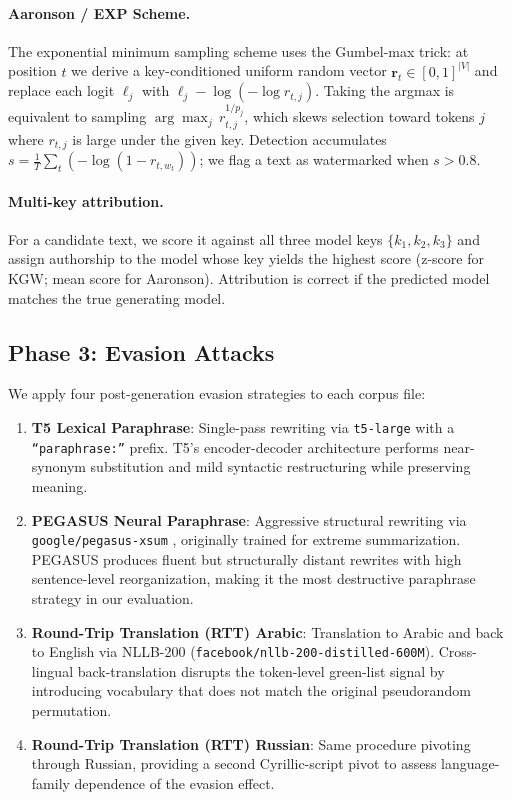 \documentclass[11pt]{article}
\begin{document}
\paragraph{Aaronson / EXP Scheme.}
The exponential minimum sampling scheme \cite{aaronson2022watermark} uses the
Gumbel-max trick: at position $t$ we derive a key-conditioned uniform random
vector $\mathbf{r}_t \in [0,1]^{|V|}$ and replace each logit $\ell_j$ with
$\ell_j - \log(-\log r_{t,j})$.
Taking the argmax is equivalent to sampling $\arg\max_j\, r_{t,j}^{1/p_j}$,
which skews selection toward tokens $j$ where $r_{t,j}$ is large under the
given key.
Detection accumulates $s = \frac{1}{T}\sum_t (-\log(1 - r_{t,w_t}))$; we
flag a text as watermarked when $s > 0.8$.

\paragraph{Multi-key attribution.}
For a candidate text, we score it against all three model keys $\{k_1, k_2,
k_3\}$ and assign authorship to the model whose key yields the highest score
(z-score for KGW; mean score for Aaronson).
Attribution is correct if the predicted model matches the true generating model.

\subsection{Phase 3: Evasion Attacks}
\label{sec:phase3}

We apply four post-generation evasion strategies to each corpus file:

\begin{enumerate}
  \item \textbf{T5 Lexical Paraphrase}: Single-pass rewriting via
    \texttt{t5-large} with a \texttt{``paraphrase:''} prefix.
    T5's encoder-decoder architecture performs near-synonym substitution and
    mild syntactic restructuring while preserving meaning.
  \item \textbf{PEGASUS Neural Paraphrase}: Aggressive structural rewriting
    via \texttt{google/pegasus-xsum} \cite{zhang2020pegasus}, originally
    trained for extreme summarization.
    PEGASUS produces fluent but structurally distant rewrites with high
    sentence-level reorganization, making it the most destructive paraphrase
    strategy in our evaluation.
  \item \textbf{Round-Trip Translation (RTT) Arabic}: Translation to Arabic
    and back to English via NLLB-200 \cite{nllbteam2022nllb}
    (\texttt{facebook/nllb-200-distilled-600M}).
    Cross-lingual back-translation disrupts the token-level green-list
    signal by introducing vocabulary that does not match the original
    pseudorandom permutation.
  \item \textbf{Round-Trip Translation (RTT) Russian}: Same procedure
    pivoting through Russian, providing a second Cyrillic-script pivot to
    assess language-family dependence of the evasion effect.
\end{enumerate}
\end{document}
